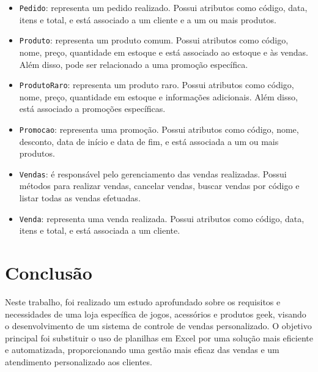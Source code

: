 \documentclass[
	12pt,				%
	openright,			%
	twoside,			%
	a4paper,			%
	english,			%
	brazil				%
	]{abntex2}
\begin{document}
\begin{itemize}
    \item \texttt{Pedido}: representa um pedido realizado. Possui atributos como código, data, itens e total, e está associado a um cliente e a um ou mais produtos.
    
    \item \texttt{Produto}: representa um produto comum. Possui atributos como código, nome, preço, quantidade em estoque e está associado ao estoque e às vendas. Além disso, pode ser relacionado a uma promoção específica.
    
    \item \texttt{ProdutoRaro}: representa um produto raro. Possui atributos como código, nome, preço, quantidade em estoque e informações adicionais. Além disso, está associado a promoções específicas.
    
    \item \texttt{Promocao}: representa uma promoção. Possui atributos como código, nome, desconto, data de início e data de fim, e está associada a um ou mais produtos.
    
    \item \texttt{Vendas}: é responsável pelo gerenciamento das vendas realizadas. Possui métodos para realizar vendas, cancelar vendas, buscar vendas por código e listar todas as vendas efetuadas.
    
    \item \texttt{Venda}: representa uma venda realizada. Possui atributos como código, data, itens e total, e está associada a um cliente.
\end{itemize}



\chapter{Conclusão}

Neste trabalho, foi realizado um estudo aprofundado sobre os requisitos e necessidades de uma loja específica de jogos, acessórios e produtos geek, visando o desenvolvimento de um sistema de controle de vendas personalizado. O objetivo principal foi substituir o uso de planilhas em Excel por uma solução mais eficiente e automatizada, proporcionando uma gestão mais eficaz das vendas e um atendimento personalizado aos clientes.
\end{document}
